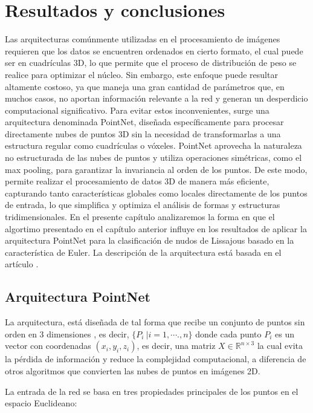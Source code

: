 \chapter{Resultados y conclusiones}
Las arquitecturas comúnmente utilizadas en el procesamiento de imágenes requieren que los datos se encuentren ordenados en cierto formato, el cual puede ser en cuadrículas 3D, lo que permite que el proceso de distribución de peso se realice para optimizar el núcleo. Sin embargo, este enfoque puede resultar altamente costoso, ya que maneja una gran cantidad de parámetros que, 
en muchos casos, no aportan información relevante a la red y generan un desperdicio computacional significativo.
Para evitar estos inconvenientes, surge una arquitectura denominada PointNet, diseñada específicamente para procesar directamente nubes de puntos 3D sin la necesidad de 
transformarlas a una estructura regular como cuadrículas o vóxeles. PointNet aprovecha la naturaleza no estructurada de las nubes de puntos y utiliza operaciones simétricas, 
como el max pooling, para garantizar la invariancia al orden de los puntos. De este modo, permite realizar el procesamiento de datos 3D de manera más eficiente, 
capturando tanto características globales como locales directamente de los puntos de entrada, lo que simplifica y optimiza el análisis de formas y estructuras tridimensionales. \cite{pointnet}
En el presente capítulo analizaremos la forma en que el algortimo presentado en el capítulo anterior 
influye en los resultados de aplicar la arquitectura PointNet para la clasificación de nudos de Lissajous 
basado en la característica de Euler.
La descripción de la arquitectura está basada en el artículo \cite{pointnet}.

\section{Arquitectura PointNet}
La arquitectura, está diseñada de tal forma que recibe un 
conjunto de puntos sin orden en 3 dimensiones , es decir,
$\{P_i\ | i = 1, \cdots .,n\}$ donde cada punto $P_i$ es 
un vector con coordenadas $(x_i,y_i,z_i)$, es decir, una matriz $X \in \mathbb{R}^{n \times 3}$ la cual evita la pérdida
de información y reduce la complejidad computacional, a diferencia 
de otros algoritmos que convierten las nubes de puntos en imágenes 2D.

La entrada de la red se basa en tres propiedades principales de los puntos en el 
espacio Euclideano:

